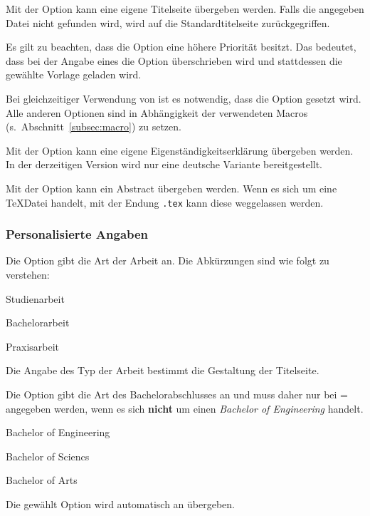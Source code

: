 \documentclass[babel=ngerman,highlight=false]{skdoc}
\begin{document}
                Mit der Option kann eine eigene Titelseite übergeben werden. Falls die angegeben Datei nicht gefunden wird, wird auf die Standardtitelseite zurückgegriffen.
    
                Es gilt zu beachten, dass die Option  eine höhere Priorität besitzt. Das bedeutet, dass bei der Angabe eines  die Option  überschrieben wird und stattdessen die gewählte Vorlage geladen wird.
    
                Bei gleichzeitiger Verwendung von  ist es notwendig, dass die Option  gesetzt wird. Alle anderen Optionen sind in Abhängigkeit der verwendeten Macros (s.~Abschnitt~\ref{subsec:macro}) zu setzen.\medskip
    
                Mit der Option kann eine eigene Eigenständigkeitserklärung übergeben werden. In der derzeitigen Version wird nur eine deutsche Variante bereitgestellt.\medskip
                
                Mit der Option kann ein Abstract übergeben werden. Wenn es sich um eine \TeX Datei handelt, mit der Endung \texttt{.tex} kann diese weggelassen werden.\medskip
    
            \subsubsection{Personalisierte Angaben}
                Die Option gibt die Art der Arbeit an. Die Abkürzungen sind wie folgt zu verstehen:
                \begin{description}[noitemsep,style=multiline,leftmargin=1cm]
                    \item[SA] Studienarbeit
                    \item[BA] Bachelorarbeit
                    \item[PA] Praxisarbeit
                \end{description}
                Die Angabe des Typ der Arbeit bestimmt die Gestaltung der Titelseite.\medskip
    
                Die Option gibt die Art des Bachelorabschlusses an und muss daher nur bei  =  angegeben werden, wenn es sich \textbf{nicht} um einen \textit{Bachelor of Engineering} handelt.
                \begin{description}[noitemsep,style=multiline,leftmargin=1cm]
                    \item[BoE] Bachelor of Engineering
                    \item[BoA] Bachelor of Sciencs
                    \item[BoS] Bachelor of Arts
                \end{description}
                Die gewählt Option wird automatisch an  übergeben.\medskip
    
\end{document}
